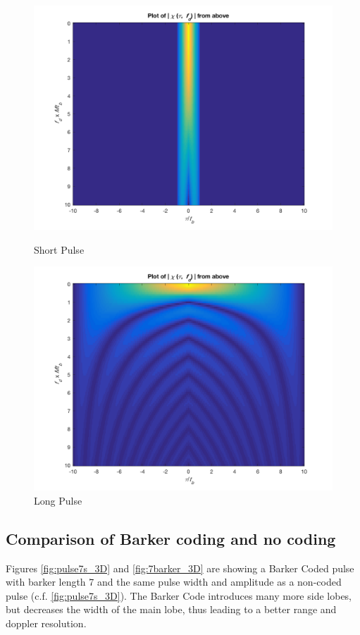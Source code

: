 \begin{figure}[!htbp]
  \centering
  \begin{minipage}[b]{0.45\textwidth}
    \includegraphics[width=\textwidth]{images/short_1s_top}
    \caption{Short Pulse}
    \label{fig:shortTop}
  \end{minipage}
  \hfill
  \begin{minipage}[b]{0.45\textwidth}
    \includegraphics[width=\textwidth]{images/long_top}
    \caption{Long Pulse}
    \label{fig:longTop2}
  \end{minipage}
\end{figure}


\subsection{Comparison of Barker coding and no coding}
Figures \ref{fig:pulse7s_3D} and \ref{fig:7barker_3D} are showing a Barker Coded pulse with barker length 7 and the same pulse width and amplitude as a non-coded pulse (c.f. \ref{fig:pulse7s_3D}).
The Barker Code introduces many more side lobes, but decreases the width of the main lobe, thus leading to a better range and doppler resolution.


